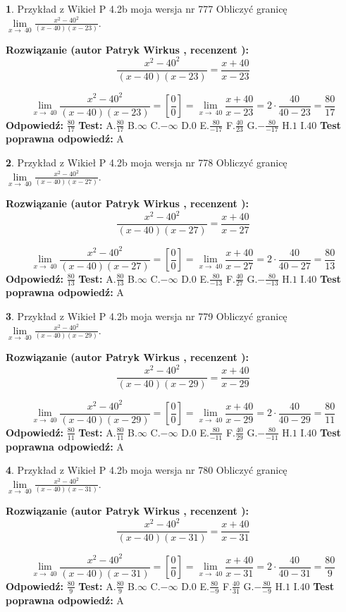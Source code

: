 \documentclass[12pt, a4paper]{article}
\theoremstyle{definition} %
\newtheorem{zad}{}
\newcommand{\zadStart}[1]{\begin{zad}#1\newline}
\newcommand{\zadStop}{\end{zad}}
\newcommand{\rozwStart}[2]{\noindent \textbf{Rozwiązanie (autor #1 , recenzent #2): }\newline}
\newcommand{\rozwStop}{\newline}
\newcommand{\odpStart}{\noindent \textbf{Odpowiedź:}\newline}
\newcommand{\odpStop}{\newline}
\newcommand{\testStart}{\noindent \textbf{Test:}\newline}
\newcommand{\testStop}{\newline}
\newcommand{\kluczStart}{\noindent \textbf{Test poprawna odpowiedź:}\newline}
\newcommand{\kluczStop}{\newline}
\begin{document}
\zadStart{Przykład z Wikieł P 4.2b moja wersja nr 777}
Obliczyć granicę $\lim\limits_{x\to\ 40}\frac{x^{2}-40^{2}}{(x-40)(x-23)}$.
\zadStop
\rozwStart{Patryk Wirkus}{}
$$\frac{x^{2}-40^{2}}{(x-40)(x-23)}=\frac{x+40}{x-23}$$

$$\lim\limits_{x\to\ 40}\frac{x^{2}-40^{2}}{(x-40)(x-23)}=[\frac{0}{0}]=\lim\limits_{x\to\ 40}\frac{x+40}{x-23}=2 \cdot \frac{40}{40-23} = \frac{80}{17}$$
\rozwStop
\odpStart
$\frac{80}{17}$
\odpStop
\testStart
A.$\frac{80}{17}$
B.$\infty$
C.$-\infty$
D.$0$
E.$\frac{80}{-17}$
F.$\frac{40}{23}$
G.$-\frac{80}{-17}$
H.$1$
I.$40$
\testStop
\kluczStart
A
\kluczStop



\zadStart{Przykład z Wikieł P 4.2b moja wersja nr 778}
Obliczyć granicę $\lim\limits_{x\to\ 40}\frac{x^{2}-40^{2}}{(x-40)(x-27)}$.
\zadStop
\rozwStart{Patryk Wirkus}{}
$$\frac{x^{2}-40^{2}}{(x-40)(x-27)}=\frac{x+40}{x-27}$$

$$\lim\limits_{x\to\ 40}\frac{x^{2}-40^{2}}{(x-40)(x-27)}=[\frac{0}{0}]=\lim\limits_{x\to\ 40}\frac{x+40}{x-27}=2 \cdot \frac{40}{40-27} = \frac{80}{13}$$
\rozwStop
\odpStart
$\frac{80}{13}$
\odpStop
\testStart
A.$\frac{80}{13}$
B.$\infty$
C.$-\infty$
D.$0$
E.$\frac{80}{-13}$
F.$\frac{40}{27}$
G.$-\frac{80}{-13}$
H.$1$
I.$40$
\testStop
\kluczStart
A
\kluczStop



\zadStart{Przykład z Wikieł P 4.2b moja wersja nr 779}
Obliczyć granicę $\lim\limits_{x\to\ 40}\frac{x^{2}-40^{2}}{(x-40)(x-29)}$.
\zadStop
\rozwStart{Patryk Wirkus}{}
$$\frac{x^{2}-40^{2}}{(x-40)(x-29)}=\frac{x+40}{x-29}$$

$$\lim\limits_{x\to\ 40}\frac{x^{2}-40^{2}}{(x-40)(x-29)}=[\frac{0}{0}]=\lim\limits_{x\to\ 40}\frac{x+40}{x-29}=2 \cdot \frac{40}{40-29} = \frac{80}{11}$$
\rozwStop
\odpStart
$\frac{80}{11}$
\odpStop
\testStart
A.$\frac{80}{11}$
B.$\infty$
C.$-\infty$
D.$0$
E.$\frac{80}{-11}$
F.$\frac{40}{29}$
G.$-\frac{80}{-11}$
H.$1$
I.$40$
\testStop
\kluczStart
A
\kluczStop



\zadStart{Przykład z Wikieł P 4.2b moja wersja nr 780}
Obliczyć granicę $\lim\limits_{x\to\ 40}\frac{x^{2}-40^{2}}{(x-40)(x-31)}$.
\zadStop
\rozwStart{Patryk Wirkus}{}
$$\frac{x^{2}-40^{2}}{(x-40)(x-31)}=\frac{x+40}{x-31}$$

$$\lim\limits_{x\to\ 40}\frac{x^{2}-40^{2}}{(x-40)(x-31)}=[\frac{0}{0}]=\lim\limits_{x\to\ 40}\frac{x+40}{x-31}=2 \cdot \frac{40}{40-31} = \frac{80}{9}$$
\rozwStop
\odpStart
$\frac{80}{9}$
\odpStop
\testStart
A.$\frac{80}{9}$
B.$\infty$
C.$-\infty$
D.$0$
E.$\frac{80}{-9}$
F.$\frac{40}{31}$
G.$-\frac{80}{-9}$
H.$1$
I.$40$
\testStop
\kluczStart
A
\kluczStop
\end{document}

